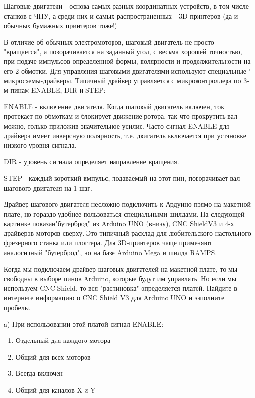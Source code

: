 Шаговые двигатели - основа самых разных координатных устройств, в том числе станков с ЧПУ, а среди них и самых распространенных - 3D-принтеров  (да и обычных бумажных принтеров тоже!)

В отличие об обычных электромоторов, шаговый двигатель не просто "вращается", а поворачивается на 
заданный угол, с весьма хорошей точностью, при подаче импульсов определенной формы, полярности и 
продолжительности на его 2 обмотки.  Для управления шаговыми двигателями  используют специальные '
микросхемы-драйверы.  Типичный драйвер управляется с микроконтроллера по 3-м пинам \linebreak ENABLE, DIR и STEP:   

ENABLE - включение двигателя.  Когда шаговый двигатель включен, ток протекает по обмоткам и блокирует движение ротора, так что прокрутить вал можно, только приложив значительное усилие.  Часто сигнал ENABLE для драйвера имеет инверсную полярность, т.е. двигатель включается при установке низкого уровня сигнала.

DIR  - уровень сигнала определяет направление вращения.

STEP -  каждый короткий импульс, подаваемый на этот пин, поворачивает вал шагового двигателя на 1 шаг.

Драйвер шагового двигателя несложно подключить к Ардуино прямо на макетной плате, но гораздо удобнее пользоваться специальными шилдами.   На следующей картинке показан"бутерброд" из Arduino UNO (внизу), CNC ShieldV3 и 4-х драйверов моторов сверху.  Это типичный расклад для любительского настольного фрезерного станка или плоттера.  Для 3D-принтеров чаще применяют аналогичный "бутерброд", но на базе Arduino Mega и шилда RAMPS.



Когда мы подключаем драйвер шаговых двигателей на макетной плате, то мы свободны в выборе пинов Arduino, которые будут им управлять.  Но если мы используем CNC Shield,  то вся "распиновка" определяется платой.  Найдите в интернете информацию о CNC Shield V3 для Arduino UNO и заполните пробелы.


a) При использовании этой платой сигнал ENABLE: 

\begin{enumerate}
    \item Отдельный для каждого мотора
    \item Общий для всех моторов
    \item Всегда включен
    \item Общий для каналов X и Y
\end{enumerate}

